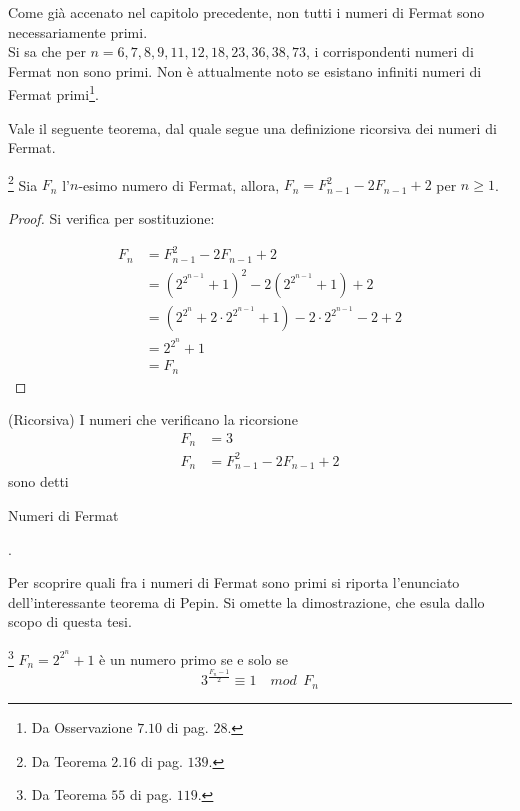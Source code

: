 Come già accenato nel capitolo precedente, non tutti i numeri di Fermat sono necessariamente primi. 
\\
Si sa che per $n = 6,7,8,9,11,12,18,23,36,38,73$, i corrispondenti numeri di Fermat non sono primi. Non è attualmente noto se esistano infiniti numeri di Fermat primi\footnote{Da \cite{Procesi} Osservazione $7.10$ di pag. $28$. }.

Vale il seguente teorema, dal quale segue una definizione ricorsiva dei numeri di Fermat.

\begin{teorema}\footnote{Da \cite{Kosh} Teorema $2.16$ di pag. $139$. }
Sia $F_n$ l'$n$-esimo numero di Fermat, allora, $F_n = F_{n-1}^2 - 2F_{n-1} + 2$ per $n \geq 1$.
\end{teorema}

\begin{proof}
Si verifica per sostituzione:

\begin{align*}
F_n & = F_{n-1}^2 - 2F_{n-1} + 2 \\
 & = (2^{2^{n-1}} +1)^2 - 2(2^{2^{n-1}} +1) + 2 \\
 & = (2^{2^{n}} + 2 \cdot 2^{2^{n-1}} +1) - 2 \cdot 2^{2^{n-1}} -2 + 2 \\
 & = 2^{2^{n}} +1\\
 & = F_n
\end{align*}
\end{proof}

\begin{definizione} (Ricorsiva)
I numeri che verificano la ricorsione
\begin{align*}
F_n &= 3\\
F_n &= F_{n-1}^2 - 2F_{n-1} + 2
\end{align*}
 sono detti \begin{bfseries}Numeri di Fermat\end{bfseries}.
\end{definizione}

Per scoprire quali fra i numeri di Fermat sono primi si riporta l'enunciato dell'interessante teorema di Pepin. Si omette la dimostrazione, che esula dallo scopo di questa tesi.

\begin{teorema}\footnote{Da \cite{Shanks} Teorema $55$ di pag. $119$. }
$F_n = 2^{2^{n}} +1$ è un numero primo se e solo se 
\begin{displaymath}
3^{\frac{F_{n} - 1}{2} }  \equiv 1 \quad  mod \phantom{z} F_{n}
\end{displaymath}
\end{teorema}

